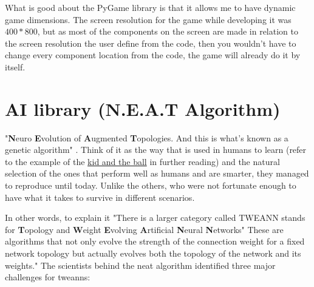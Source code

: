 What is good about the PyGame library is that it allows me to have dynamic game dimensions. The screen resolution for the game while developing it was $400*800$, but as most of the components on the screen are made in relation to the screen resolution the user define from the code, then you wouldn't have to change every component location from the code, the game will already do it by itself.

\section{AI library (N.E.A.T Algorithm)}\label{sec:ai-library-neat-algorithm}
"\textbf{N}euro \textbf{E}volution of \textbf{A}ugmented \textbf{T}opologies. And this is what's known as a genetic algorithm" . Think of it as the way that is used in humans to learn (refer to the example of the \hyperref[sec:ai-life-example]{kid and the ball} in further reading) and the natural selection of the ones that perform well as humans and are smarter, they managed to reproduce until today. Unlike the others, who were not fortunate enough to have what it takes to survive in different scenarios.

In other words, to explain it "There is a larger category called TWEANN stands for \textbf{T}opology and \textbf{W}eight \textbf{E}volving \textbf{A}rtificial \textbf{N}eural \textbf{N}etworks"  These are algorithms that not only evolve the strength of the connection weight for a fixed network topology but actually evolves both the topology of the network and its weights." The scientists behind the neat algorithm identified three major challenges for tweanns:

